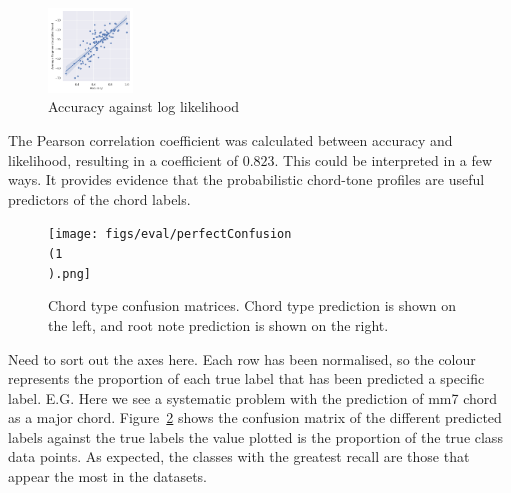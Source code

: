 \documentclass[12pt,a4paper,twoside,openany]{report} \usepackage[pdfborder={0 0 0}]{hyperref}    %
\theoremstyle{definition} \newtheorem{definition}{Definition}[section]
\begin{document}
  \begin{figure}[h]
    \begin{center}
      \includegraphics[width=0.2\textwidth]{figs/eval/perfectAccuracyChordType.png}
    \end{center}
    \caption{Accuracy against log likelihood}
    \label{fig:}
  \end{figure}
  
  The Pearson correlation coefficient was calculated between accuracy and likelihood, resulting in a coefficient 
  of $0.823$. This could be interpreted in a few ways. It provides evidence that the probabilistic chord-tone profiles
  are useful predictors of the chord labels.

  \begin{figure}[h]
    \begin{center}
      \texttt{[image: figs/eval/perfectConfusion\\(1\\).png]}
    \end{center}
    \caption{Chord type confusion matrices. Chord type prediction is shown on the left, and root note prediction is shown on the right.}
    \label{fig:perfectConfusion}
  \end{figure}

  Need to sort out the axes here. Each row has been normalised, so the colour represents the proportion of each true
  label that has been predicted a specific label. E.G. Here we see a systematic problem with the prediction of mm7 chord
  as a major chord. 
  Figure~\ref{fig:perfectConfusion} shows the confusion matrix of the different predicted labels against the true
  labels the value plotted is the proportion of the true class data points.
  As expected, the classes with the greatest recall are those that appear the most in the datasets. 
\end{document}

